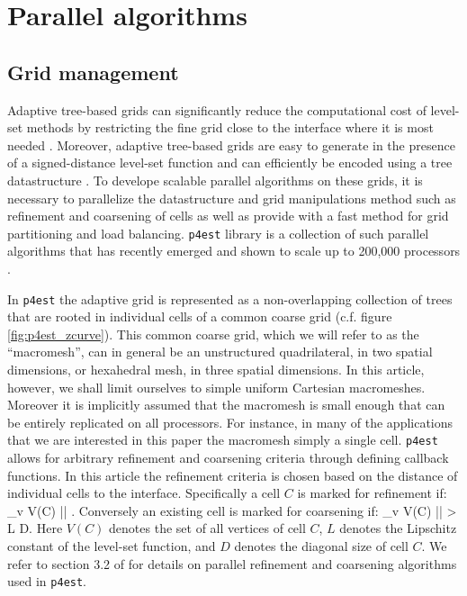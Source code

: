 \section{Parallel algorithms}\label{sec:parallel algorithms}
\subsection{Grid management}
Adaptive tree-based grids can significantly reduce the computational cost of level-set methods by restricting the fine grid close to the interface where it is most needed \cite{Strain:99:Tree-Methods-for-Mov}. Moreover, adaptive tree-based grids are easy to generate in the presence of a signed-distance level-set function \cite{Min;Gibou:07:A-second-order-accur} and can efficiently be encoded using a tree datastructure \cite{Samet:90:Applications-of-Spat}. To develope scalable parallel algorithms on these grids, it is necessary to parallelize the datastructure and grid manipulations method such as refinement and coarsening of cells as well as provide with a fast method for grid partitioning and load balancing. \texttt{p4est} library \cite{p4est-github} is a collection of such parallel algorithms that has recently emerged and shown to scale up to 200,000 processors \cite{Burstedde;Wilcox;Ghattas:11:p4est:-Scalable-Algo}.

In \texttt{p4est} the adaptive grid is represented as a non-overlapping collection of trees that are rooted in individual cells of a common coarse grid (c.f. figure \ref{fig:p4est_zcurve}). This common coarse grid, which we will refer to as the ``macromesh'', can in general be an unstructured quadrilateral, in two spatial dimensions, or hexahedral mesh, in three spatial dimensions. In this article, however, we shall limit ourselves to simple uniform Cartesian macromeshes. Moreover it is implicitly assumed that the macromesh is small enough that can be entirely replicated on all processors. For instance, in many of the applications that we are interested in this paper the macromesh simply a single cell. \texttt{p4est} allows for arbitrary refinement and coarsening criteria through defining callback functions. In this article the refinement criteria is chosen based on the distance of individual cells to the interface. Specifically a cell $C$ is marked for refinement if:
\be
\min_{\forall v \in V(C)} |\phi| \le {}.
\label{eq:refine}
\ee
Conversely an existing cell is marked for coarsening if:
\be
\min_{\forall v \in V(C)} |\phi| > L D.
\label{eq:coarsen}
\ee
Here $V(C)$ denotes the set of all vertices of cell $C$, $L$ denotes the Lipschitz constant of the level-set function, and $D$ denotes the diagonal size of cell $C$. We refer to section 3.2 of \cite{Burstedde;Wilcox;Ghattas:11:p4est:-Scalable-Algo} for details on parallel refinement and coarsening algorithms used in \texttt{p4est}.

